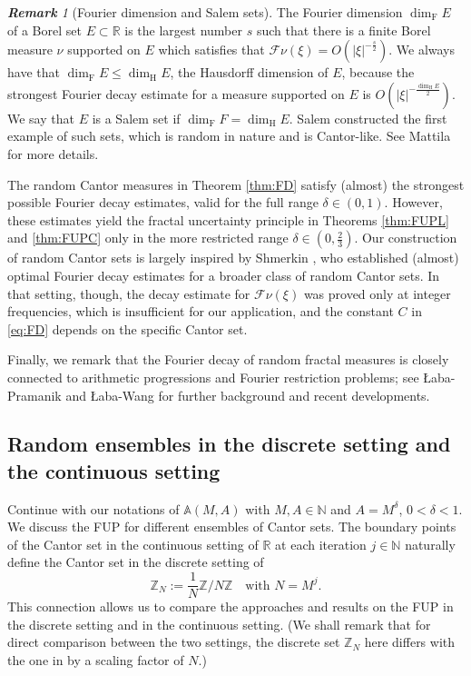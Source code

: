 \documentclass[12pt,reqno]{amsart}
\newcommand\Ab{\mathbb{A}}
\newcommand\Fc{\mathcal{F}}
\newcommand\N{\mathbb{N}}
\newcommand\R{\mathbb{R}}
\newcommand\Z{\mathbb{Z}}
\theoremstyle{plain}
\theoremstyle{remark}
\newtheorem*{rmk}{\textbf{Remark}}
\numberwithin{equation}{section}
\begin{document}
\begin{rmk}[Fourier dimension and Salem sets]
The Fourier dimension $\dim_\mathrm{F}E$ of a Borel set $E\subset\R$ is the largest number $s$ such that there is a finite Borel measure $\nu$ supported on $E$ which satisfies that $\Fc\nu(\xi)=O(|\xi|^{-\frac s2})$. We always have that $\dim_\mathrm{F}E\le\dim_\mathrm{H}E$, the Hausdorff dimension of $E$, because the strongest Fourier decay estimate for a measure supported on $E$ is $O(|\xi|^{-\frac{\dim_\mathrm{H}E}{2}})$. We say that $E$ is a Salem set if $\dim_\mathrm{F}F=\dim_\mathrm{H}E$. Salem \cite{Sa} constructed the first example of such sets, which is random in nature and is Cantor-like. See Mattila \cite[Chapter 12]{M} for more details.

The random Cantor measures in Theorem \ref{thm:FD} satisfy (almost) the strongest possible Fourier decay estimates, valid for the full range $\delta \in (0,1)$. However, these estimates yield the fractal uncertainty principle in Theorems \ref{thm:FUPL} and \ref{thm:FUPC} only in the more restricted range $\delta \in (0,\tfrac{2}{3})$. Our construction of random Cantor sets is largely inspired by Shmerkin \cite[Theorem 2.1]{Sh}, who established (almost) optimal Fourier decay estimates for a broader class of random Cantor sets. In that setting, though, the decay estimate for $\Fc\nu(\xi)$ was proved only at integer frequencies, which is insufficient for our application, and the constant $C$ in \eqref{eq:FD} depends on the specific Cantor set.

Finally, we remark that the Fourier decay of random fractal measures is closely connected to arithmetic progressions and Fourier restriction problems; see \L{}aba-Pramanik \cite{LP} and \L{}aba-Wang \cite{LW} for further background and recent developments.
\end{rmk}

\subsection{Random ensembles in the discrete setting and the continuous setting}\label{sec:comp}
Continue with our notations of $\Ab(M,A)$ with $M,A\in\N$ and $A=M^\delta$, $0<\delta<1$. We discuss the FUP for different ensembles of Cantor sets. The boundary points of the Cantor set in the continuous setting of $\R$ at each iteration $j\in\N$ naturally define the Cantor set in the discrete setting of 
$$\Z_N:=\frac1N\Z/N\Z\quad\text{with }N=M^j.$$
This connection allows us to compare the approaches and results on the FUP in the discrete setting and in the continuous setting. (We shall remark that for direct comparison between the two settings, the discrete set $\Z_N$ here differs with the one in \cite{DJ1, EH} by a scaling factor of $N$.) 
\end{document}
